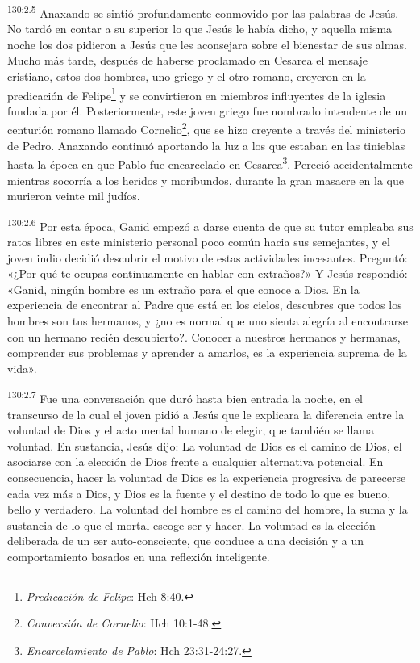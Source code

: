 \par 
\textsuperscript{130:2.5} Anaxando se sintió profundamente conmovido por las palabras de Jesús. No tardó en contar a su superior lo que Jesús le había dicho, y aquella misma noche los dos pidieron a Jesús que les aconsejara sobre el bienestar de sus almas. Mucho más tarde, después de haberse proclamado en Cesarea el mensaje cristiano, estos dos hombres, uno griego y el otro romano, creyeron en la predicación de Felipe\footnote{\textit{Predicación de Felipe}: Hch 8:40.} y se convirtieron en miembros influyentes de la iglesia fundada por él. Posteriormente, este joven griego fue nombrado intendente de un centurión romano llamado Cornelio\footnote{\textit{Conversión de Cornelio}: Hch 10:1-48.}, que se hizo creyente a través del ministerio de Pedro. Anaxando continuó aportando la luz a los que estaban en las tinieblas hasta la época en que Pablo fue encarcelado en Cesarea\footnote{\textit{Encarcelamiento de Pablo}: Hch 23:31-24:27.}. Pereció accidentalmente mientras socorría a los heridos y moribundos, durante la gran masacre en la que murieron veinte mil judíos.

\par 
\textsuperscript{130:2.6} Por esta época, Ganid empezó a darse cuenta de que su tutor empleaba sus ratos libres en este ministerio personal poco común hacia sus semejantes, y el joven indio decidió descubrir el motivo de estas actividades incesantes. Preguntó: «¿Por qué te ocupas continuamente en hablar con extraños?» Y Jesús respondió: «Ganid, ningún hombre es un extraño para el que conoce a Dios. En la experiencia de encontrar al Padre que está en los cielos, descubres que todos los hombres son tus hermanos, y ¿no es normal que uno sienta alegría al encontrarse con un hermano recién descubierto?. Conocer a nuestros hermanos y hermanas, comprender sus problemas y aprender a amarlos, es la experiencia suprema de la vida».

\par 
\textsuperscript{130:2.7} Fue una conversación que duró hasta bien entrada la noche, en el transcurso de la cual el joven pidió a Jesús que le explicara la diferencia entre la voluntad de Dios y el acto mental humano de elegir, que también se llama voluntad. En sustancia, Jesús dijo: La voluntad de Dios es el camino de Dios, el asociarse con la elección de Dios frente a cualquier alternativa potencial. En consecuencia, hacer la voluntad de Dios es la experiencia progresiva de parecerse cada vez más a Dios, y Dios es la fuente y el destino de todo lo que es bueno, bello y verdadero. La voluntad del hombre es el camino del hombre, la suma y la sustancia de lo que el mortal escoge ser y hacer. La voluntad es la elección deliberada de un ser auto-consciente, que conduce a una decisión y a un comportamiento basados en una reflexión inteligente.

